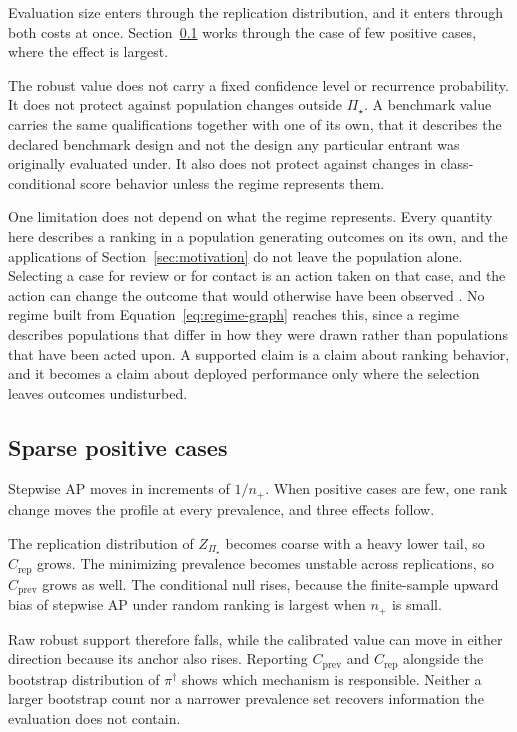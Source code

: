 \documentclass[11pt]{article}
\newcommand{\PSet}{\Pi_\star}
\theoremstyle{remark}
\begin{document}
Evaluation size enters through the replication distribution, and it enters through both costs at once. Section~\ref{sec:sparse} works through the case of few positive cases, where the effect is largest.

The robust value does not carry a fixed confidence level or recurrence probability. It does not protect against population changes outside $\PSet$. A benchmark value carries the same qualifications together with one of its own, that it describes the declared benchmark design and not the design any particular entrant was originally evaluated under. It also does not protect against changes in class-conditional score behavior unless the regime represents them.

One limitation does not depend on what the regime represents. Every quantity here describes a ranking in a population generating outcomes on its own, and the applications of Section~\ref{sec:motivation} do not leave the population alone. Selecting a case for review or for contact is an action taken on that case, and the action can change the outcome that would otherwise have been observed \cite{perdomo2020performative}. No regime built from Equation~\eqref{eq:regime-graph} reaches this, since a regime describes populations that differ in how they were drawn rather than populations that have been acted upon. A supported claim is a claim about ranking behavior, and it becomes a claim about deployed performance only where the selection leaves outcomes undisturbed.

\subsection{Sparse positive cases}
\label{sec:sparse}

Stepwise AP moves in increments of $1/n_+$. When positive cases are few, one rank change moves the profile at every prevalence, and three effects follow.

The replication distribution of $Z_{\PSet}$ becomes coarse with a heavy lower tail, so $C_{\mathrm{rep}}$ grows. The minimizing prevalence becomes unstable across replications, so $C_{\mathrm{prev}}$ grows as well. The conditional null rises, because the finite-sample upward bias of stepwise AP under random ranking is largest when $n_+$ is small.

Raw robust support therefore falls, while the calibrated value can move in either direction because its anchor also rises. Reporting $C_{\mathrm{prev}}$ and $C_{\mathrm{rep}}$ alongside the bootstrap distribution of $\pi^\dagger$ shows which mechanism is responsible. Neither a larger bootstrap count nor a narrower prevalence set recovers information the evaluation does not contain.
\end{document}

